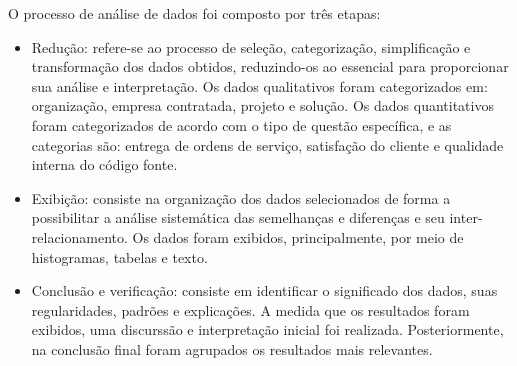O processo de análise de dados foi composto por três etapas:
\begin{itemize}
\item Redução: refere-se ao processo de seleção, categorização, simplificação e transformação dos dados obtidos, reduzindo-os ao essencial para proporcionar sua análise e interpretação. Os dados qualitativos foram categorizados em: organização, empresa contratada, projeto e solução. Os dados quantitativos foram categorizados de acordo com o tipo de questão específica, e as categorias são: entrega de ordens de serviço, satisfação do cliente e qualidade interna do código fonte.
\item Exibição: consiste na organização dos dados selecionados de forma a possibilitar a análise sistemática das semelhanças e diferenças e seu inter-relacionamento. Os dados foram exibidos, principalmente, por meio de histogramas, tabelas e texto.
\item Conclusão e verificação: consiste em identificar o significado dos dados, suas regularidades, padrões e explicações. A medida que os resultados foram exibidos, uma discurssão e interpretação inicial foi realizada. Posteriormente, na conclusão final foram agrupados os resultados mais relevantes.
\end{itemize}

